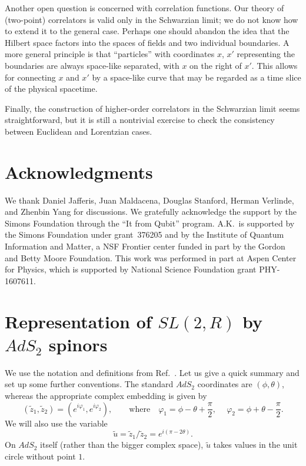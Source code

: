 \documentclass[12pt]{article}
\newcommand{\vp}{\varphi}
\newcommand{\RR}{\mathbb{R}}
\DeclareMathOperator{\SL}{SL}
\DeclareMathOperator{\AdS}{AdS}
\newcommand{\tu}{\tilde{u}}
\newcommand{\tz}{\tilde{z}}
\def\widetilde#1{#1}%
\def\AdS{AdS}
\def\SL{SL}
\def\RR{R}
\begin{document}
Another open question is concerned with correlation functions. Our theory of (two-point) correlators is valid only in the Schwarzian limit; we do not know how to extend it to the general case. Perhaps one should abandon the idea that the Hilbert space factors into the spaces of fields and two individual boundaries. A more general principle is that ``particles'' with coordinates $x$, $x'$ representing the boundaries are always space-like separated, with $x$ on the right of $x'$. This allows for connecting $x$ and $x'$ by a space-like curve that may be regarded as a time slice of the physical spacetime. 

Finally, the construction of higher-order correlators in the Schwarzian limit seems straightforward, but it is still a nontrivial exercise to check the consistency between Euclidean and Lorentzian cases.


\section*{Acknowledgments}
We thank Daniel Jafferis, Juan Maldacena, Douglas Stanford, Herman Verlinde, and Zhenbin Yang for discussions. We gratefully acknowledge the support by the Simons Foundation through the ``It from Qubit'' program. A.K.\ is supported by the Simons Foundation under grant~376205 and by the Institute of Quantum Information and Matter, a NSF Frontier center funded in part by the Gordon and Betty Moore Foundation. This work was performed in part at Aspen Center for Physics, which is supported by National Science Foundation grant PHY-1607611.

\appendix

\section{Representation of $\widetilde{\SL}(2,\RR)$ by $\widetilde{\AdS}_2$ spinors} \label{app:repth}

We use the notation and definitions from Ref.~\cite{SL2R}. Let us give a quick summary and set up some further conventions. The standard $\widetilde{\AdS}_2$ coordinates are $(\phi,\theta)$, whereas the appropriate complex embedding is given by
\begin{equation}\label{vp1vp2}
(\tz_1,\tz_2)=(e^{i\vp_1},e^{i\vp_2}),\qquad \text{where}\quad \vp_1=\phi-\theta+\frac{\pi}{2},\quad\: \vp_2=\phi+\theta-\frac{\pi}{2}.
\end{equation}
We will also use the variable
\begin{equation}
\tu=\tz_1/\tz_2=e^{i(\pi-2\theta)}.
\end{equation}
On $\widetilde{\AdS}_2$ itself (rather than the bigger complex space), $\tu$ takes values in the unit circle without point $1$.
\end{document}
